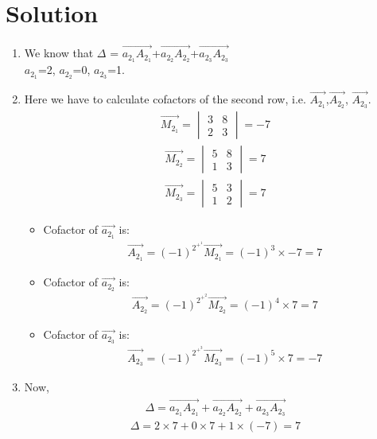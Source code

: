 \documentclass[journal,12pt,twocolumn]{IEEEtran}
\begin{document}
\section{Solution}
\begin{enumerate}
\item We know that $\Delta$ = $\vec{a_2_1A_2_1}$+$\vec{a_2_2A_2_2}$+$\vec{a_2_3A_2_3}$ \\
 $a_2_1$=2, $a_2_2$=0, $a_2_3$=1. \\

\item Here we have to calculate cofactors of the second row, i.e.
    $\vec{A_2_1}$,$\vec{A_2_2}$, $\vec{A_2_3}$.
\begin{align}
    \vec{M_2_1}= \begin{vmatrix} 3&8 \\ 2&3 \end{vmatrix}= -7
\end{align}
\begin{align}
    \vec{M_2_2}= \begin{vmatrix} 5&8 \\ 1&3 \end{vmatrix} = 7
\end{align}
\begin{align}
    \vec{M_2_3}= \begin{vmatrix} 5&3 \\ 1&2 \end{vmatrix} = 7
\end{align}
\begin{itemize}
    \item Cofactor of $\vec{a_2_1}$ is: 
\begin{align}
    \vec{A_2_1}=(-1)^2^+^1 \vec{M_2_1}= (-1)^3 \times -7= 7
\end{align}
\item Cofactor of $\vec{a_2_2}$ is: 
\begin{align}
    \vec{A_2_2}=(-1)^2^+^2 \vec{M_2_2}= (-1)^4 \times 7= 7
\end{align}
\item Cofactor of $\vec{a_2_3}$ is: 
\begin{align}
    \vec{A_2_3}=(-1)^2^+^3 \vec{M_2_3}= (-1)^5 \times 7= -7
\end{align}
\end{itemize}
\item Now,
\begin{align}
    \Delta = \vec{a_2_1A_2_1}+\vec{a_2_2A_2_2}+\vec{a_2_3A_2_3}
\end{align}
\begin{align}
    \Delta  = 2 \times 7 + 0 \times 7 + 1 \times (-7) = 7
\end{align}
\end{enumerate}
\end{document}
